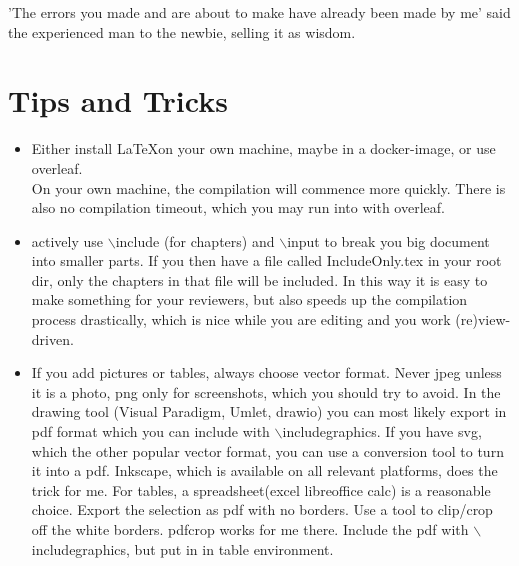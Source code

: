 \begin{savequote}[15cm]
  \raggedleft
\sffamily
'The errors you made and are about to make have already been made by me' said the experienced man to the newbie, selling it as wisdom.
\end{savequote}

\chapter{Tips and Tricks}

\begin{itemize}
\item Either install \LaTeX on your own machine, maybe in a docker-image, or use overleaf. \\
    On your own machine, the compilation will commence more quickly. There is also no compilation timeout, which you may run into with overleaf.
\item actively use $\backslash$include (for chapters) and $\backslash$input to break you 
 big document into smaller parts. If you then have a file called IncludeOnly.tex in your root dir, only the chapters in that file will be included. In this way it is easy to make something for your reviewers, but also speeds up the compilation process drastically, which is nice while you are editing and you work (re)view-driven.
\item If you add pictures or tables, always choose vector format. Never jpeg unless it is a photo, png only for screenshots, which you should try to avoid. In the drawing tool (Visual Paradigm, Umlet, drawio)  you can most likely export in pdf format which you can include with $\backslash$includegraphics. If you have svg, which the other popular vector format, you can use a conversion tool to turn it into a pdf. Inkscape, which is available on all relevant platforms, does the trick for me.
  For tables, a spreadsheet(excel libreoffice calc) is a reasonable choice. Export the selection as pdf with no borders.  Use a tool to clip/crop off the white borders. pdfcrop works for me there. Include the pdf with $\backslash$includegraphics, but put in in table environment.
  
\end{itemize}
